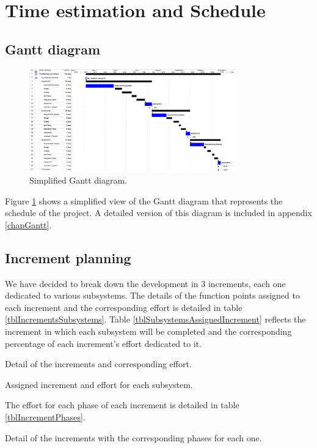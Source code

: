 \section{Time estimation and Schedule}
\label{secTimeEstimation}
\subsection{Gantt diagram}

\begin{figure}[hbtp]
\centering
\includegraphics[width=0.8\textwidth]{../GanttDiagram.png}
\caption{Simplified Gantt diagram.}
\label{figGanttSimple}
\end{figure}

Figure \ref{figGanttSimple} shows a simplified view of the Gantt diagram that represents the schedule of the project. A detailed version of this diagram is included in appendix \ref{chapGantt}.

\subsection{Increment planning}

We have decided to break down the development in 3 increments, each one dedicated to various subsystems. The details of the function points assigned to each increment and the corresponding effort is detailed in table \ref{tblIncrementsSubsystems}. Table \ref{tblSubsystemsAssignedIncrement} reflects the increment in which each subsystem will be completed and the corresponding percentage of each increment's effort dedicated to it.

\begin{table}[hbtp]
\centering

\caption{Detail of the increments and corresponding effort.}
\label{tblIncrementsSubsystems}
\end{table}

\begin{table}[hbtp]
\centering

\caption{Assigned increment and effort for each subsystem.}
\label{tblSubsystemsAssignedIncrement}
\end{table}

The effort for each phase of each increment is detailed in table \ref{tblIncrementPhases}.

\begin{table}[hbtp]
\centering

\caption{Detail of the increments with the corresponding phases for each one.}
\label{tblIncrementPhases}
\end{table}
